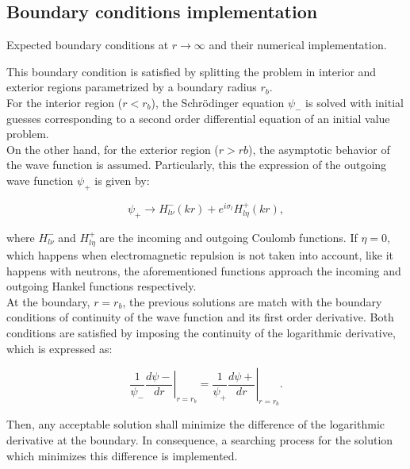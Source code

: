 \documentclass[openany]{book}
\begin{document}
\subsection{Boundary conditions implementation} \label{sub:diffSolvingBoundaries}

Expected boundary conditions at $r \rightarrow \infty$ and their numerical implementation.

This boundary condition is satisfied by splitting the problem in interior and exterior regions parametrized by a boundary radius $r_b$. \\

For the interior region ($r < r_b$), the Schrödinger equation $\psi_{-}$ is solved with initial guesses corresponding to a second order differential equation of an initial value problem.  \\

On the other hand, for the exterior region ($r > rb$), the asymptotic behavior of the wave function is assumed. Particularly, this the expression of the outgoing wave function $\psi_{+}$ is given by: 

\begin{equation}\label{eq:numericalIntegration_outgoingFunction}
	\psi_{+} \rightarrow H^{-}_{l\nu}(kr) + e^{i\sigma_l} H^{+}_{l\eta}(kr),
\end{equation}
	
where $H^{-}_{l\nu}$ and $H^{+}_{l\eta}$ are the incoming and outgoing Coulomb functions. If $\eta = 0$, which happens when electromagnetic repulsion is not taken into account, like it happens with neutrons, the aforementioned functions approach the incoming and outgoing Hankel functions respectively. \\
	
At the boundary, $r = r_b$, the previous solutions are match with the boundary conditions of continuity of the wave function and its first order derivative. Both conditions are satisfied by imposing the continuity of the logarithmic derivative, which is expressed as: 

\begin{equation}\label{eq:numericalIntegration_boundaryCondition}
	\left.\frac{1}{\psi_{-} } \frac{d\psi{-}}{dr}\right|_{r = r_b} = \left.\frac{1}{\psi_{+} } \frac{d\psi{+}}{dr}\right|_{r = r_b}. 
\end{equation}

Then, any acceptable solution shall minimize the difference of the logarithmic derivative at the boundary. In consequence, a searching process for the solution which minimizes this difference is implemented. \\
\end{document}
